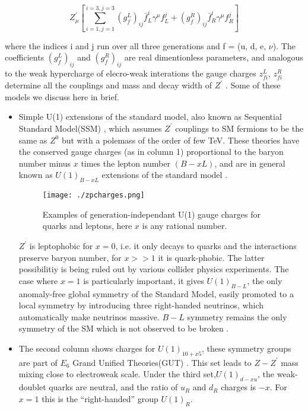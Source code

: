 \documentclass[12pt,a4paper]{article}		%
\begin{document}
 \begin{equation}
	 Z_\mu^\prime \left[ \sum_{i=1,j=1}^{i=3,j=3} \left(g_f^L \right)_{ij} \bar{f}_L^i \gamma^\mu f_L^j + \left(g_f^R \right)_{ij} \bar{f}_R^i \gamma^\mu f_R^j	  \right]
 \end{equation} 
 
 where the indices i and j run over all three generations and f = (u, d, e, $\nu$). The coefficients $\left(g_f^L \right)_{ij}$ and $\left(g_f^R \right)_{ij}$ are real dimentionless parameters, and analogous to the weak hypercharge of elecro-weak interations the gauge charges $z_{fi}^L$, $z_{fi}^R$ determine all the couplings and mass and decay width of $Z^\prime$ \cite{zphysics,zpheno2}. Some of these models we discuss here in brief.
    
 \begin{itemize}
 	\item Simple U(1) extensions of the standard model, also known as Sequential Standard Model(SSM) \cite{zpheno1}, which assumes $Z^\prime$ couplings to SM fermions to be the same as $Z^0$ but with a polemass of the order of few TeV. These theories have the conserved gauge charges (as in column 1) proportional to the baryon number minus $x$ times the lepton number $(B - x L)$, and are in general known as $U(1)_{B-xL}$ extensions of the standard model \cite{zpdg}.
 	
 	\begin{figure}[h]
 		\begin{centering}	
 			\texttt{[image: ./zpcharges.png]} 
 			\caption{ Examples of generation-independant U(1) gauge charges for quarks and leptons, here $x$ is any rational number.}
 			\label{U1charges}
 			\centering
 		\end{centering} 		
 	\end{figure}   
 	   
 	$Z^\prime$ is leptophobic for $x=0$, i.e. it only decays to quarks and the interactions preserve baryon number, for $x>>1$ it is quark-phobic. The latter possibilitiy is being ruled out by various collider physics experiments. The case where $x=1$ is particularly important, it gives $U(1)_{B-L}$,  the only anomaly-free global symmetry of the Standard Model, easily promoted to a local symmetry by introducing three right-handed neutrinos, which automatically make neutrinos massive. $B-L$ symmetry remains the only symmetry of the SM which is not observed to be broken \cite{bl}.   	  
 	   
	\item The second column shows charges for $U(1)_{10+x5}$, these symmetry groups are part of $E_6$ Grand Unified Theories(GUT) \cite{zpheno4}. This set leads to $	Z - Z^\prime$ mass mixing close to electroweak scale. Under the third set,$U(1)_{d−xu}$, the weak-doublet quarks are neutral, and the ratio of $u_R$ and $d_R$ charges is $−x$.  For $x= 1$ this is the “right-handed” group $U(1)_R$. 	
 \end{itemize} 
\end{document}
